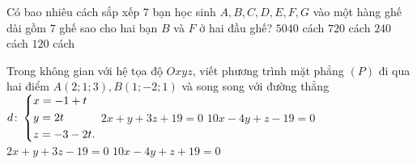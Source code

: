 \begin{ex}%
Có bao nhiêu cách sắp xếp $7$ bạn học sinh $A, B, C, D, E, F, G$ vào một hàng ghế dài gồm $7$ ghế sao cho hai bạn $B$ và $F$ ở hai đầu ghế?
\choice
{$5040$ cách}
{$720$ cách}
{\True $240$ cách}
{$120$ cách}
\end{ex}
\begin{ex}%
Trong không gian với hệ tọa độ $Oxyz$, viết phương trình mặt phẳng $(P)$ đi qua hai điểm $A(2;1;3), B(1;-2;1)$ và song song với đường thẳng $d\colon \left\{\begin{aligned}&x=-1+t\\ &y=2t\\ &z=-3-2t.\end{aligned}\right.$
\choice
{$2x+y+3z+19=0$}
{\True $10x-4y+z-19=0$}
{$2x+y+3z-19=0$}
{$10x-4y+z+19=0$}
\end{ex}
